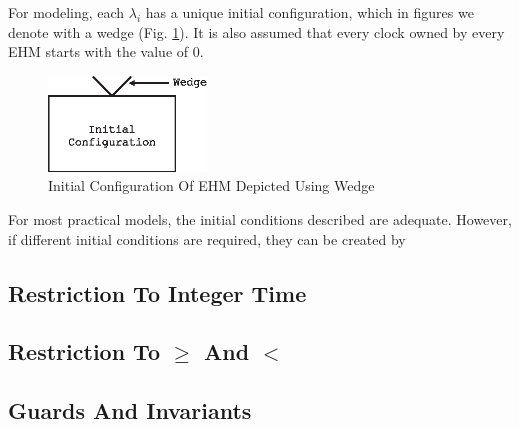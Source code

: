 For modeling, each $\lambda_i$ has a unique initial configuration, which in figures we 
denote with a wedge (Fig. \ref{fig:smfs0:sico0:00}).  It is also assumed that 
every clock owned by every EHM starts with the value of 0.

\begin{figure}
\centering
\includegraphics[height=1.0in]{s_mfs0/figini01.eps}
\caption{Initial Configuration Of EHM Depicted Using Wedge}
\label{fig:smfs0:sico0:00}
\end{figure}

For most practical models, the initial conditions described are adequate.
However, if different initial conditions are required, they can be 
created by 


\subsection{Restriction To Integer Time}
\label{smfs0:srit0}


\subsection{Restriction To $\geq$ And $<$}
\label{smfs0:srge0}


\subsection{Guards And Invariants}
\label{smfs0:sgai0}


